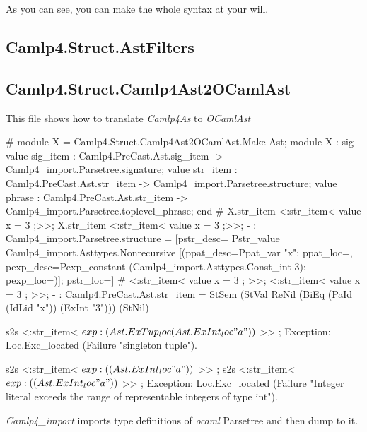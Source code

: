 As you can see, you can make the whole syntax at your will.

\subsection{Camlp4.Struct.AstFilters}
\label{Camlp4.Struct.AstFilters}


\subsection{Camlp4.Struct.Camlp4Ast2OCamlAst}
\label{Camlp4.Struct.Camlp4Ast2OCamlAst}

This file shows how to translate \textit{Camlp4As} to
\textit{OCamlAst}


\begin{ocamlcode}
# module X = Camlp4.Struct.Camlp4Ast2OCamlAst.Make Ast;  
module X :
  sig
    value sig_item :
      Camlp4.PreCast.Ast.sig_item ->
      Camlp4_import.Parsetree.signature;
    value str_item :
      Camlp4.PreCast.Ast.str_item ->
      Camlp4_import.Parsetree.structure;
    value phrase :
      Camlp4.PreCast.Ast.str_item ->
      Camlp4_import.Parsetree.toplevel_phrase;
   end
# X.str_item <:str_item< value x = 3 ;>>;
X.str_item <:str_item< value x = 3 ;>>;
- : Camlp4_import.Parsetree.structure =
[{pstr_desc=
   Pstr_value Camlp4_import.Asttypes.Nonrecursive
    [({ppat_desc=Ppat_var "x"; ppat_loc=},
     {pexp_desc=Pexp_constant (Camlp4_import.Asttypes.Const_int 3);
      pexp_loc=})];
  pstr_loc=}]
# <:str_item< value x = 3 ; >>;
<:str_item< value x = 3 ; >>;
- : Camlp4.PreCast.Ast.str_item =
StSem  (StVal  ReNil (BiEq  (PaId  (IdLid  "x")) (ExInt  "3"))) (StNil)
\end{ocamlcode}


\begin{ocamlcode}
s2s <:str_item< $exp: (Ast.ExTup _loc (Ast.ExInt _loc "a")) $ >> ;
Exception: Loc.Exc_located  (Failure "singleton tuple").
\end{ocamlcode}

\begin{ocamlcode}
s2s <:str_item< $exp: ( (Ast.ExInt _loc "a")) $ >> ;
s2s <:str_item< $exp: ( (Ast.ExInt _loc "a")) $ >> ;
Exception:
Loc.Exc_located 
 (Failure
   "Integer literal exceeds the range of representable integers of type int").  
\end{ocamlcode}
   
 
\textit{Camlp4\_import} imports type definitions of \textit{ocaml}
Parsetree and then dump to it.

